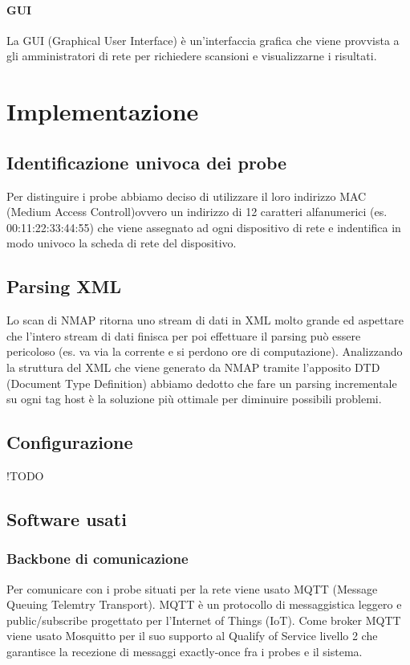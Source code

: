 \documentclass[target=bach,aauheader=,style=]{thud}
\begin{document}
\FloatBarrier


\subsubsection{GUI} 
La GUI (Graphical User Interface) è un'interfaccia grafica che viene provvista a gli amministratori di rete per richiedere scansioni e visualizzarne i risultati.

\FloatBarrier

\chapter{Implementazione}

\section{Identificazione univoca dei probe}
Per distinguire i probe abbiamo deciso di utilizzare il loro indirizzo MAC (Medium Access Controll)ovvero un indirizzo di 12 caratteri alfanumerici (es. 00:11:22:33:44:55) che viene assegnato ad ogni dispositivo di rete e indentifica in modo univoco la scheda di rete del dispositivo.

\section{Parsing XML}
Lo scan di NMAP ritorna uno stream di dati in XML molto grande ed aspettare che l'intero stream di dati finisca per poi effettuare il parsing può essere pericoloso (es. va via la corrente e si perdono ore di computazione). Analizzando la struttura del XML che viene generato da NMAP tramite l'apposito DTD (Document Type Definition) abbiamo dedotto che fare un parsing incrementale su ogni tag host è la soluzione più ottimale per diminuire possibili problemi.

\section{Configurazione}
!TODO

\section{Software usati}

\subsection{Backbone di comunicazione}
Per comunicare con i probe situati per la rete viene usato MQTT (Message Queuing Telemtry Transport). 
MQTT è un protocollo di messaggistica leggero e public/subscribe progettato per l'Internet of Things (IoT).
Come broker MQTT viene usato Mosquitto per il suo supporto al Qualify of Service livello 2 che garantisce la recezione di messaggi exactly-once fra i probes e il sistema.
\end{document}
